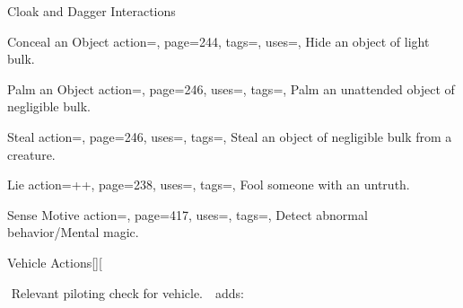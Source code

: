 \begin{PageBackLandscape}
\begin{TablesHalf}{\backTableHeight}
\begin{Table}{Cloak and Dagger Interactions}
            \breakLine
            \begin{entry}{Conceal an Object}{%
                action=,
                page=244,
                tags=\Manipulate,
                uses={\Stealth[tags={S}]},
            }
                Hide an object of light bulk.
            \end{entry}
            \begin{entry}{Palm an Object}{%
                action=,
                page=246,
                uses=\Thievery,
                tags=\Manipulate,
            }
                Palm an unattended object of negligible bulk.\hfill
            \end{entry}
            \begin{entry}{Steal}{%
                action=,
                page=246,
                uses=\Thievery,
                tags=\Manipulate,
            }
                Steal an object of negligible bulk from a creature.\hfill
            \end{entry}
            \breakLine
            \begin{entry}{Lie}{%
                action=++,
                page=238,
                uses={\Deception[tags={S}]},
                tags=\Mental\Concentrate,
            }
                Fool someone with an untruth. \Auditory\,\Linguistic \hfill
            \end{entry}
            \begin{entry}{Sense Motive}{%
                action=,
                page=417,
                uses={\Perception[tags={S}]},
                tags=\Concentrate,
            }
                Detect abnormal behavior/Mental magic. \hfill
                \;
            \end{entry}
        \end{Table}
        \TableSpace
        \begin{Table}{Vehicle Actions}[][%
            \begin{minipage}[b]{0.755\linewidth}%
                \Piloting\,\dash\,Relevant piloting check for vehicle. \hfill
                \Reck \,\dash\,  adds:
                \textbf{}\\

\end{minipage}
\end{Table}
\end{TablesHalf}
\end{PageBackLandscape}
